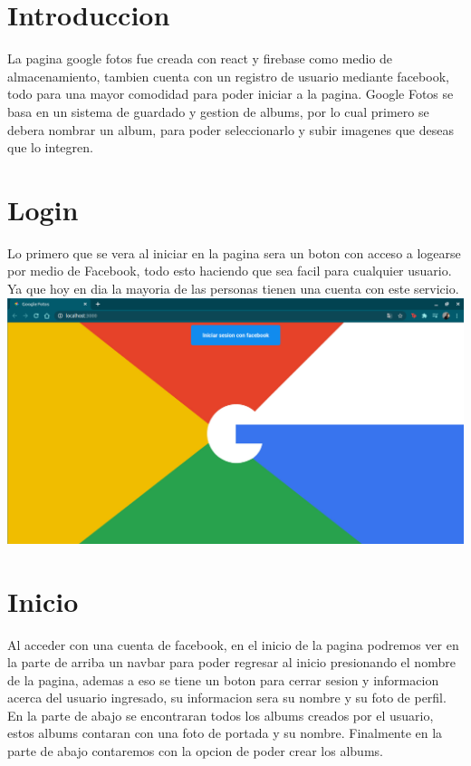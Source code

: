 \documentclass[12pt,a4paper]{article}
\begin{document}

\vspace{1 cm}
\section{Introduccion}
	La pagina google fotos fue creada con react y firebase como medio de almacenamiento, tambien cuenta con un registro de usuario mediante facebook, todo para una mayor comodidad para poder iniciar a la pagina. Google Fotos se basa en un sistema de guardado y gestion de albums, por lo cual primero se debera nombrar un album, para poder seleccionarlo y subir imagenes que deseas que lo integren.\\

\section{Login}
	Lo primero que se vera al iniciar en la pagina sera un boton con acceso a logearse por medio de Facebook, todo esto haciendo que sea facil para cualquier usuario. Ya que hoy en dia la mayoria de las personas tienen una cuenta con este servicio.\\

\includegraphics[scale=0.20]{Login}

\section{Inicio}
	Al acceder con una cuenta de facebook, en el inicio de la pagina podremos ver en la parte de arriba un navbar para poder regresar al inicio presionando el nombre de la pagina, ademas a eso se tiene un boton para cerrar sesion y informacion acerca del usuario ingresado, su informacion sera su nombre y su foto de perfil. En la parte de abajo se encontraran todos los albums creados por el usuario, estos albums contaran con una foto de portada y su nombre. Finalmente en la parte de abajo contaremos con la opcion de poder crear los albums.\\
\end{document}
